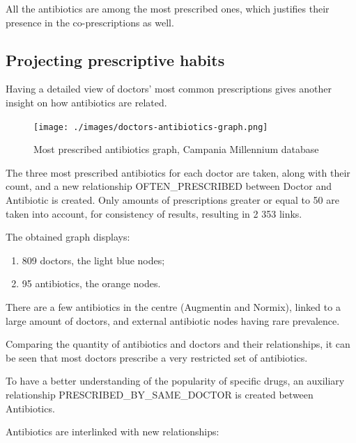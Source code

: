 All the antibiotics are among the most prescribed ones, which justifies their presence in the co-prescriptions as well.

\subsection{Projecting prescriptive habits}
Having a detailed view of doctors' most common prescriptions gives another insight on how antibiotics are related.

\begin{figure}[h]
	\centering
	\texttt{[image: ./images/doctors-antibiotics-graph.png]}
	\caption{\small Most prescribed antibiotics graph, Campania Millennium database}
\end{figure}

The three most prescribed antibiotics for each doctor are taken, along with their count, and a new relationship OFTEN\_PRESCRIBED between Doctor and Antibiotic is created. Only amounts of prescriptions greater or equal to 50 are taken into account, for consistency of results, resulting in 2 353 links.

The obtained graph displays:
\begin{enumerate}
	\item 809 doctors, the light blue nodes;
	\item 95 antibiotics, the orange nodes.
\end{enumerate}

There are a few antibiotics in the centre (Augmentin and Normix), linked to a large amount of doctors, and external antibiotic nodes having rare prevalence.

Comparing the quantity of antibiotics and doctors and their relationships, it can be seen that most doctors prescribe a very restricted set of antibiotics. 

To have a better understanding of the popularity of specific drugs, an auxiliary relationship PRESCRIBED\_BY\_SAME\_DOCTOR is created between Antibiotics. 

Antibiotics are interlinked with new relationships:

